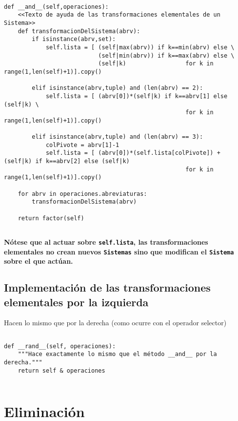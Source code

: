 \documentclass[11pt]{report}
\begin{document}
\begin{verbatim}

def __and__(self,operaciones):
    <<Texto de ayuda de las transformaciones elementales de un Sistema>>
    def transformacionDelSistema(abrv):
        if isinstance(abrv,set):
            self.lista = [ (self|max(abrv)) if k==min(abrv) else \
                           (self|min(abrv)) if k==max(abrv) else \
                           (self|k)                 for k in range(1,len(self)+1)].copy()
            
        elif isinstance(abrv,tuple) and (len(abrv) == 2):
            self.lista = [ (abrv[0])*(self|k) if k==abrv[1] else (self|k) \
                                                    for k in range(1,len(self)+1)].copy()

        elif isinstance(abrv,tuple) and (len(abrv) == 3):
            colPivote = abrv[1]-1
            self.lista = [ (abrv[0])*(self.lista[colPivote]) + (self|k) if k==abrv[2] else (self|k)
                                                    for k in range(1,len(self)+1)].copy()

    for abrv in operaciones.abreviaturas:
        transformacionDelSistema(abrv)

    return factor(self)
        
\end{verbatim}

\textbf{Nótese que al actuar sobre \texttt{self.lista}, las transformaciones elementales no crean nuevos 
\texttt{Sistemas} sino que modifican el \texttt{Sistema} sobre el que actúan.}

\subsection{Implementación de las transformaciones elementales por la izquierda}
\label{sec:orgd46eda2}

Hacen lo mismo que por la derecha (como ocurre con el operador selector)

\begin{verbatim}
        
def __rand__(self, operaciones):
    """Hace exactamente lo mismo que el método __and__ por la derecha."""
    return self & operaciones
    
\end{verbatim}

\section{Eliminación}
\label{sec:orgc7a5476}
\end{document}
